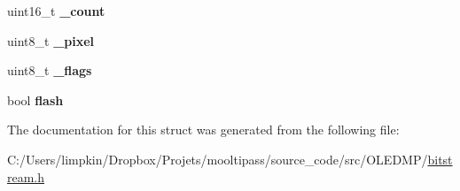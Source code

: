 \begin{DoxyCompactItemize}
\item 
\hypertarget{structbitstream__t_af818e6e9d7218107aa8fcf4e054c5a10}{uint16\+\_\+t {\bfseries \+\_\+count}}\label{structbitstream__t_af818e6e9d7218107aa8fcf4e054c5a10}

\item 
\hypertarget{structbitstream__t_a10c4ba029fe86182aa5dff53d2486072}{uint8\+\_\+t {\bfseries \+\_\+pixel}}\label{structbitstream__t_a10c4ba029fe86182aa5dff53d2486072}

\item 
\hypertarget{structbitstream__t_a5629227e4392e5086f50519e78e4c973}{uint8\+\_\+t {\bfseries \+\_\+flags}}\label{structbitstream__t_a5629227e4392e5086f50519e78e4c973}

\item 
\hypertarget{structbitstream__t_a5a483d65b3bc3c34154e6b31c07e4aa9}{bool {\bfseries flash}}\label{structbitstream__t_a5a483d65b3bc3c34154e6b31c07e4aa9}

\end{DoxyCompactItemize}


The documentation for this struct was generated from the following file\+:\begin{DoxyCompactItemize}
\item 
C\+:/\+Users/limpkin/\+Dropbox/\+Projets/mooltipass/source\+\_\+code/src/\+O\+L\+E\+D\+M\+P/\hyperlink{bitstream_8h}{bitstream.\+h}\end{DoxyCompactItemize}
